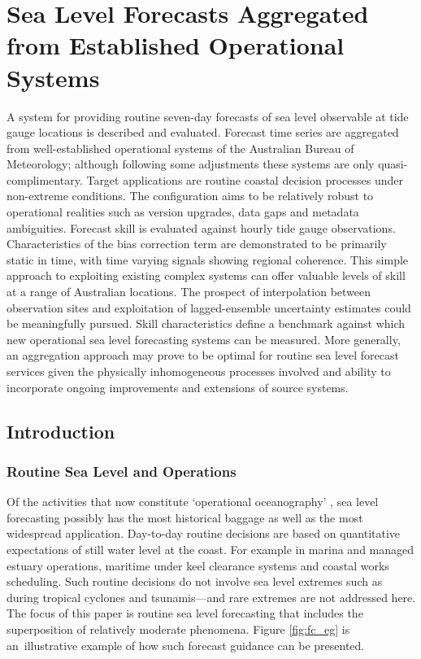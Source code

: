 \chapter{Sea Level Forecasts Aggregated from Established Operational Systems}
A system for providing routine seven-day forecasts of sea level observable at tide gauge locations is described and evaluated.
Forecast time series are aggregated from well-established operational systems of the Australian Bureau of Meteorology; although following some adjustments these systems are only quasi-complimentary.
Target applications are routine coastal decision processes under non-extreme conditions.
The configuration aims to be relatively robust to operational realities such as version upgrades, data gaps and metadata ambiguities.
Forecast skill is evaluated against hourly tide gauge observations.  
Characteristics of the bias correction term are demonstrated to be primarily static in time, with time varying signals showing regional coherence.
This simple approach to exploiting existing complex systems can offer valuable levels of skill at a range of Australian locations.
The prospect of interpolation between observation sites and exploitation of lagged-ensemble uncertainty estimates could be meaningfully pursued. 
Skill characteristics define a benchmark against which new operational sea level forecasting systems can be measured. 
More generally, an aggregation approach may prove to be optimal for routine sea level forecast services given the physically inhomogeneous processes involved and ability to incorporate ongoing improvements and extensions of source systems.
\section{Introduction}
\subsection{Routine Sea Level and Operations}

Of the activities that now constitute `operational oceanography' \cite{Bell:2009uv}, sea level forecasting possibly has the most historical baggage as well as the most widespread application.
Day-to-day routine decisions are based on quantitative expectations of still water level \cite{Pugh:2014di} at the coast.  
For example in marina and managed estuary operations, maritime under keel clearance systems and coastal works scheduling. 
Such routine decisions do not involve sea level extremes such as during tropical cyclones and tsunamis---and rare extremes are not addressed here. 
The focus of this paper is routine sea level forecasting that includes the superposition of relatively moderate phenomena.
Figure \ref{fig:fc_eg} is an~illustrative example of how such forecast guidance can be presented. 


